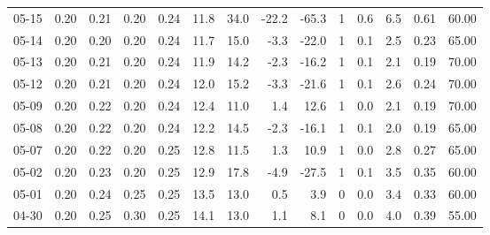 \begin{threeparttable}
{\begin{tabular}{lrrrrrrrrrrrrr}
  05-15 &          0.20 &          0.21 &          0.20 &        0.24 &                11.8 &                34.0 &      -22.2 &        -65.3 &              1 &                 0.6 &              6.5 &            0.61 &                  60.00 \\
  05-14 &          0.20 &          0.20 &          0.20 &        0.24 &                11.7 &                15.0 &       -3.3 &        -22.0 &              1 &                 0.1 &              2.5 &            0.23 &                  65.00 \\
  05-13 &          0.20 &          0.21 &          0.20 &        0.24 &                11.9 &                14.2 &       -2.3 &        -16.2 &              1 &                 0.1 &              2.1 &            0.19 &                  70.00 \\
  05-12 &          0.20 &          0.21 &          0.20 &        0.24 &                12.0 &                15.2 &       -3.3 &        -21.6 &              1 &                 0.1 &              2.6 &            0.24 &                  70.00 \\
  05-09 &          0.20 &          0.22 &          0.20 &        0.24 &                12.4 &                11.0 &        1.4 &         12.6 &              1 &                 0.0 &              2.1 &            0.19 &                  70.00 \\
  05-08 &          0.20 &          0.22 &          0.20 &        0.24 &                12.2 &                14.5 &       -2.3 &        -16.1 &              1 &                 0.1 &              2.0 &            0.19 &                  65.00 \\
  05-07 &          0.20 &          0.22 &          0.20 &        0.25 &                12.8 &                11.5 &        1.3 &         10.9 &              1 &                 0.0 &              2.8 &            0.27 &                  65.00 \\
  05-02 &          0.20 &          0.23 &          0.20 &        0.25 &                12.9 &                17.8 &       -4.9 &        -27.5 &              1 &                 0.1 &              3.5 &            0.35 &                  60.00 \\
  05-01 &          0.20 &          0.24 &          0.25 &        0.25 &                13.5 &                13.0 &        0.5 &          3.9 &              0 &                 0.0 &              3.4 &            0.33 &                  60.00 \\
  04-30 &          0.20 &          0.25 &          0.30 &        0.25 &                14.1 &                13.0 &        1.1 &          8.1 &              0 &                 0.0 &              4.0 &            0.39 &                  55.00 \\

\end{tabular}}
\end{threeparttable}
